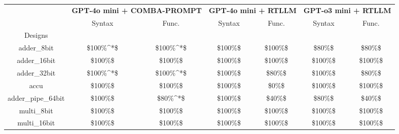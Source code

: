 \begin{tabular}{c|cc|cc|cc}
\toprule
 & \multicolumn{2}{r}{\bfseries GPT‑4o mini + COMBA-PROMPT} & \multicolumn{2}{r}{\bfseries GPT‑4o mini + RTLLM } & \multicolumn{2}{r}{\bfseries GPT‑o3 mini + RTLLM } \\
 & Syntax & Func. & Syntax & Func. & Syntax & Func. \\
Designs &  &  &  &  &  &  \\
\midrule
adder\_8bit & \color{black} {\cellcolor{lightblue}} \$100\%^*\$ & \color{black} {\cellcolor{lightgreen}} \$100\%^*\$ & \color{black} {\cellcolor{lightblue}} \$100\%\$ & \color{black} {\cellcolor{lightgreen}} \$100\%\$ & \$80\%\$ & \$80\%\$ \\ \midrule
adder\_16bit & \color{black} {\cellcolor{lightblue}} \$100\%\$ & \color{black} {\cellcolor{lightgreen}} \$100\%\$ & \color{black} {\cellcolor{lightblue}} \$100\%\$ & \color{black} {\cellcolor{lightgreen}} \$100\%\$ & \color{black} {\cellcolor{lightblue}} \$100\%\$ & \color{black} {\cellcolor{lightgreen}} \$100\%\$ \\ \midrule
adder\_32bit & \color{black} {\cellcolor{lightblue}} \$100\%^*\$ & \color{black} {\cellcolor{lightgreen}} \$100\%^*\$ & \color{black} {\cellcolor{lightblue}} \$100\%\$ & \$80\%\$ & \color{black} {\cellcolor{lightblue}} \$100\%\$ & \$80\%\$ \\ \midrule
accu & \color{black} {\cellcolor{lightblue}} \$100\%\$ & \color{black} {\cellcolor{lightgreen}} \$100\%\$ & \color{black} {\cellcolor{lightblue}} \$100\%\$ & \$0\%\$ & \color{black} {\cellcolor{lightblue}} \$100\%\$ & \color{black} {\cellcolor{lightgreen}} \$100\%\$ \\ \midrule
adder\_pipe\_64bit & \color{black} {\cellcolor{lightblue}} \$100\%\$ & \color{black} {\cellcolor{lightgreen}} \$80\%^*\$ & \color{black} {\cellcolor{lightblue}} \$100\%\$ & \$40\%\$ & \$80\%\$ & \$40\%\$ \\ \midrule
multi\_8bit & \color{black} {\cellcolor{lightblue}} \$100\%\$ & \color{black} {\cellcolor{lightgreen}} \$100\%\$ & \color{black} {\cellcolor{lightblue}} \$100\%\$ & \color{black} {\cellcolor{lightgreen}} \$100\%\$ & \color{black} {\cellcolor{lightblue}} \$100\%\$ & \color{black} {\cellcolor{lightgreen}} \$100\%\$ \\ \midrule
multi\_16bit & \color{black} {\cellcolor{lightblue}} \$100\%\$ & \color{black} {\cellcolor{lightgreen}} \$100\%\$ & \color{black} {\cellcolor{lightblue}} \$100\%\$ & \color{black} {\cellcolor{lightgreen}} \$100\%\$ & \color{black} {\cellcolor{lightblue}} \$100\%\$ & \color{black} {\cellcolor{lightgreen}} \$100\%\$ \\ \midrule

\end{tabular}

